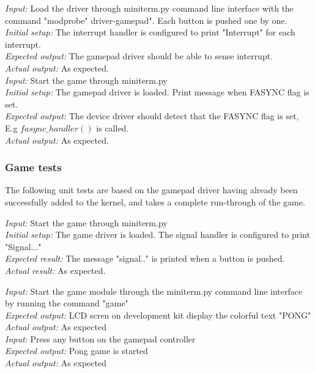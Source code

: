 \emph{Input: } Load the driver through miniterm.py command line interface with the command "modprobe" driver-gamepad". Each button is pushed one by one.\\
\emph{Initial setup: } The interrupt handler is configured to print "Interrupt" for each interrupt.\\
\emph{Expected output: } The gamepad driver should be able to sense interrupt.\\
\emph{Actual output: } As expected. \\ 

\emph{Input: } Start the game through miniterm.py  \\
\emph{Initial setup: } The gamepad driver is loaded. Print message when FASYNC flag is set.\\
\emph{Expected output: } The device driver should detect that the FASYNC flag is set, E.g $fasync\_handler()$ is called.\\ 
\emph{Actual output: } As expected. \\






\subsubsection{Game tests}

The following unit tests are based on the gamepad driver having already been successfully added to the kernel, and takes a complete run-through of the game.

\emph{Input: } Start the game through miniterm.py\\
\emph{Initial setup: } The game driver is loaded. The signal handler is configured to print "Signal..."\\
\emph{Expected result: } The message "signal.." is printed when a button is pushed. \\
\emph{Actual result: } As expected. 

\emph{Input: } Start the game module through the miniterm.py command line interface by running the command "game"\\
\emph{Expected output: } LCD scren on development kit display the colorful text "PONG"\\
\emph{Actual output: } As expected \\

\emph{Input: } Press any button on the gamepad controller\\
\emph{Expected output: } Pong game is started\\
\emph{Actual output: } As expected \\


